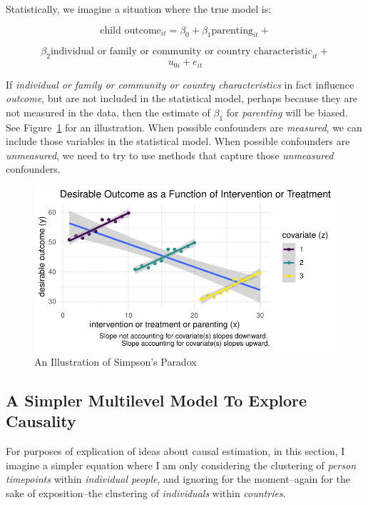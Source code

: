 \documentclass[
  letterpaper,
  DIV=11,
  numbers=noendperiod]{scrreprt}
\begin{document}
Statistically, we imagine a situation where the true model is:

\[\text{child outcome}_{it} = \beta_0 + \beta_1 \text{parenting}_{it} +\]

\[\beta_2 \text{individual or family or community or country characteristic}_{it} + \]
\[u_{0i} + e_{it}\]

If \emph{individual or family or community or country characteristics}
in fact influence \emph{outcome}, but are not included in the
statistical model, perhaps because they are not measured in the data,
then the estimate of \(\beta_1\) for \emph{parenting} will be biased.
See Figure~\ref{fig-Simpson} for an illustration. When possible
confounders are \emph{measured}, we can include those variables in the
statistical model. When possible confounders are \emph{unmeasured}, we
need to try to use methods that capture those \emph{unmeasured}
confounders.

\begin{figure}

{\centering \includegraphics{longitudinal_files/figure-pdf/fig-Simpson-1.pdf}

}

\caption{\label{fig-Simpson}An Illustration of Simpson's Paradox}

\end{figure}

\hypertarget{a-simpler-multilevel-model-to-explore-causality}{%
\subsection{A Simpler Multilevel Model To Explore
Causality}\label{a-simpler-multilevel-model-to-explore-causality}}

For purposes of explication of ideas about causal estimation, in this
section, I imagine a simpler equation where I am only considering the
clustering of \emph{person timepoints} within \emph{individual people},
and ignoring for the moment--again for the sake of exposition--the
clustering of \emph{individuals} within \emph{countries}.
\end{document}
